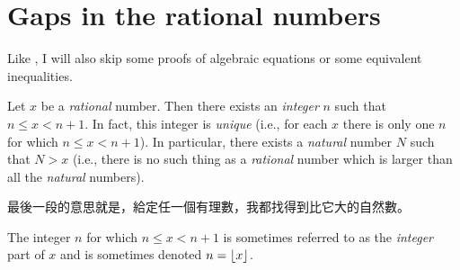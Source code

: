 \section{Gaps in the rational numbers} \label {sec 4.4}

\begin{note}
Like , I will also skip some proofs of algebraic equations or some equivalent inequalities.
\end{note}

\begin{proposition}  \label{prop 4.4.1}
Let \(x\) be a \emph{rational} number.
Then there exists an \emph{integer} \(n\) such that \(n \le x < n + 1\).
In fact, this integer is \emph{unique} (i.e., for each \(x\) there is only one \(n\) for which \(n \le x < n + 1\)).
In particular, there exists a \emph{natural} number \(N\) such that \(N > x\) (i.e., there is no such thing as a \emph{rational} number which is larger than all the \emph{natural} numbers).
\end{proposition}

\begin{note}
最後一段的意思就是，給定任一個有理數，我都找得到比它大的自然數。
\end{note}

\begin{remark} \label{remark 4.4.2}
The integer \(n\) for which \(n \le x < n + 1\) is sometimes referred to as the \emph{integer} part of \(x\) and is sometimes denoted \(n = \lfloor{x}\rfloor\).
\end{remark}

